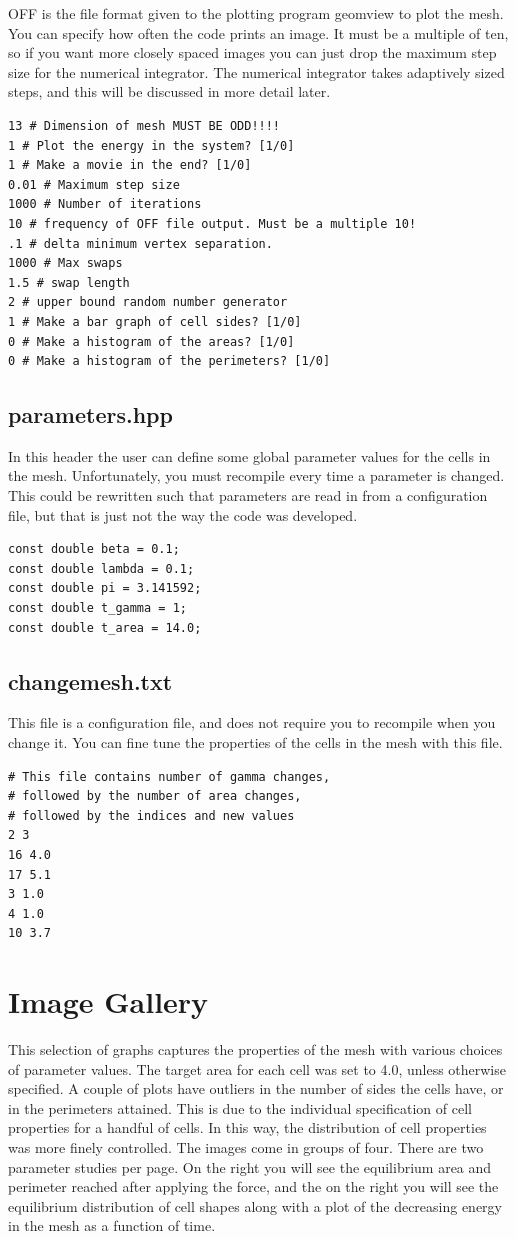 OFF is the file format given to the plotting program geomview to plot the mesh. You can specify how often the code prints an image. It must be a multiple of ten, so if you want more closely spaced images you can just drop the maximum step size for the numerical integrator. The numerical integrator takes adaptively sized steps, and this will be discussed in more detail later. 

\begin{lstlisting}
13 # Dimension of mesh MUST BE ODD!!!!
1 # Plot the energy in the system? [1/0]
1 # Make a movie in the end? [1/0]
0.01 # Maximum step size
1000 # Number of iterations
10 # frequency of OFF file output. Must be a multiple 10!
.1 # delta minimum vertex separation.
1000 # Max swaps
1.5 # swap length
2 # upper bound random number generator
1 # Make a bar graph of cell sides? [1/0]
0 # Make a histogram of the areas? [1/0]
0 # Make a histogram of the perimeters? [1/0]
\end{lstlisting}
\subsection{parameters.hpp}
In this header the user can define some global parameter values for the cells in the mesh. Unfortunately, you must recompile every time a parameter is changed. This could be rewritten such that parameters are read in from a configuration file, but that is just not the way the code was developed. 
\begin{lstlisting}
const double beta = 0.1;
const double lambda = 0.1;
const double pi = 3.141592;
const double t_gamma = 1;
const double t_area = 14.0;
\end{lstlisting}
\subsection{changemesh.txt}
This file is a configuration file, and does not require you to recompile when you change it. You can fine tune the properties of the cells in the mesh with this file.
\begin{lstlisting}
# This file contains number of gamma changes, 
# followed by the number of area changes, 
# followed by the indices and new values
2 3
16 4.0
17 5.1
3 1.0
4 1.0
10 3.7
\end{lstlisting}
\section{Image Gallery}
This selection of graphs captures the properties of the mesh with various choices of parameter values. The target area for each cell was set to 4.0, unless otherwise specified. A couple of plots have outliers in the number of sides the cells have, or in the perimeters attained. This is due to the individual specification of cell properties for a handful of cells. In this way, the distribution of cell properties was more finely controlled. The images come in groups of four. There are two parameter studies per page. On the right you will see the equilibrium area and perimeter reached after applying the force, and the on the right you will see the equilibrium distribution of cell shapes along with a plot of the decreasing energy in the mesh as a function of time.

